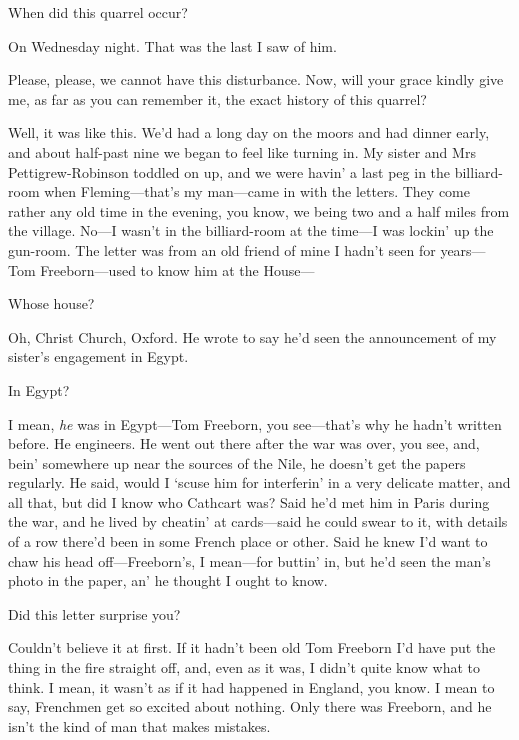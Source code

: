 \begin{dialogue}
 When did this quarrel occur?

 On Wednesday night. That was the last I saw of him. 

 Please, please, we cannot have this disturbance. Now, will your grace kindly give me, as far as you can remember it, the exact history of this quarrel?

 Well, it was like this. We'd had a long day on the moors and had dinner early, and about half-past nine we began to feel like turning in. My sister and Mrs Pettigrew-Robinson toddled on up, and we were havin' a last peg in the billiard-room when Fleming—that's my man—came in with the letters. They come rather any old time in the evening, you know, we being two and a half miles from the village.  No—I wasn't in the billiard-room at the time—I was lockin' up the gun-room. The letter was from an old friend of mine I hadn't seen for years—Tom Freeborn—used to know him at the House—

 Whose house?

 Oh, Christ Church, Oxford. He wrote to say he'd seen the announcement of my sister's engagement in Egypt.

 In Egypt?

 I mean, \textit{he} was in Egypt—Tom Freeborn, you see—that's why he hadn't written before. He engineers. He went out there after the war was over, you see, and, bein' somewhere up near the sources of the Nile, he doesn't get the papers regularly. He said, would I `scuse him for interferin' in a very delicate matter, and all that, but did I know who Cathcart was? Said he'd met him in Paris during the war, and he lived by cheatin' at cards—said he could swear to it, with details of a row there'd been in some French place or other. Said he knew I'd want to chaw his head off—Freeborn's, I mean—for buttin' in, but he'd seen the man's photo in the paper, an' he thought I ought to know.

 Did this letter surprise you?

 Couldn't believe it at first. If it hadn't been old Tom Freeborn I'd have put the thing in the fire straight off, and, even as it was, I didn't quite know what to think. I mean, it wasn't as if it had happened in England, you know. I mean to say, Frenchmen get so excited about nothing. Only there was Freeborn, and he isn't the kind of man that makes mistakes.


\end{dialogue}
